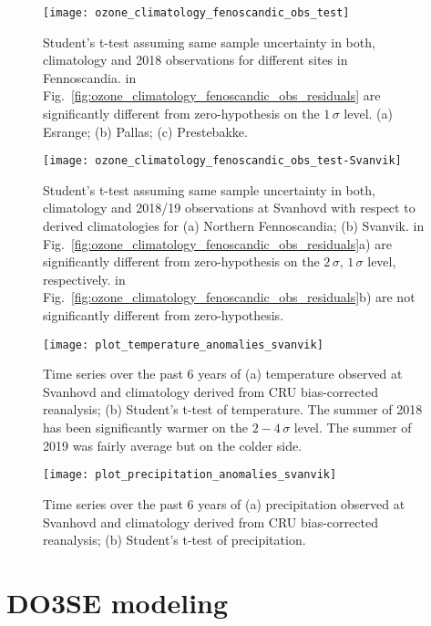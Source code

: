 \documentclass[bg, manuscript]{copernicus}
\begin{document}
\begin{figure}[t]
  \texttt{[image: ozone\_climatology\_fenoscandic\_obs\_test]}
  \caption{Student's t-test assuming same sample uncertainty in both, climatology and 2018 observations for different sites in Fennoscandia. \chem{\Delta[O_3]} in Fig.~\ref{fig:ozone_climatology_fenoscandic_obs_residuals} are significantly different from zero-hypothesis on the $1\,\sigma$ level. (a) Esrange; (b) Pallas; (c) Prestebakke.}
  \label{fig:ozone_climatology_fenoscandic_obs_test}
\end{figure}

\begin{figure}[t]
  \texttt{[image: ozone\_climatology\_fenoscandic\_obs\_test-Svanvik]}
  \caption{Student's t-test assuming same sample uncertainty in both, climatology and 2018/19 observations at Svanhovd with respect to derived climatologies for (a) Northern Fennoscandia; (b) Svanvik. \chem{\Delta[O_3]} in Fig.~\ref{fig:ozone_climatology_fenoscandic_obs_residuals}a) are significantly different from zero-hypothesis on the $2\,\sigma$,  $1\,\sigma$ level, respectively. \chem{\Delta[O_3]} in Fig.~\ref{fig:ozone_climatology_fenoscandic_obs_residuals}b) are not significantly different from zero-hypothesis.}
  \label{fig:ozone_climatology_fenoscandic_obs_test-Svanvik}
\end{figure}


\begin{figure}[t]
  \texttt{[image: plot\_temperature\_anomalies\_svanvik]}
  \caption{Time series over the past 6 years of (a) temperature observed at Svanhovd and climatology derived from CRU bias-corrected reanalysis; (b) Student's t-test of temperature. The summer of 2018 has been significantly warmer on the $2-4\,\sigma$ level. The summer of 2019 was fairly average but on the colder side.}
  \label{fig:plot_temperature_anomalies_svanvik}
\end{figure}

\begin{figure}[t]
  \texttt{[image: plot\_precipitation\_anomalies\_svanvik]}
  \caption{Time series over the past 6 years of (a) precipitation observed at Svanhovd and climatology derived from CRU bias-corrected reanalysis; (b) Student's t-test of precipitation.}
  \label{fig:plot_precipitation_anomalies_svanvik}
\end{figure}


\section{DO3SE modeling}
\end{document}
